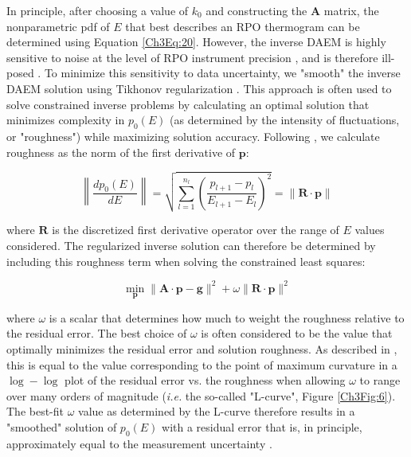 In principle, after choosing a value of $k_{0}$ and constructing the $\mathbf{A}$ matrix, the nonparametric pdf of $E$ that best describes an RPO thermogram can be determined using Equation \ref{Ch3Eq:20}. However, the inverse DAEM is highly sensitive to noise at the level of RPO instrument precision \citep[\textit{i.e.} approximately $\pm 5$ ppm, $\pm 5$\textdegree C;][]{Hemingway:2016rc}, and is therefore ill-posed \citep{Hansen:1994uc}. To minimize this sensitivity to data uncertainty, we "smooth" the inverse DAEM solution using Tikhonov regularization \citep{Tikhonov:1977ui,Hansen:1994uc,Forney:2012dr,Forney:2012hz}. This approach is often used to solve constrained inverse problems by calculating an optimal solution that minimizes complexity in $p_{0}(E)$ (as determined by the intensity of fluctuations, or "roughness") while maximizing solution accuracy. Following \citet{Forney:2012hz}, we calculate roughness as the norm of the first derivative of $\mathbf{p}$:

\begin{equation}\label{Ch3Eq:22}
	\left\| \frac{d p_{0}(E)}{dE} \right\| = \sqrt{ \sum_{l=1}^{n_{l}}\left( \frac{p_{l+1} - p_{l}}{E_{l+1} - E_{l}}\right)^{2}} = \| \mathbf{R} \cdot \mathbf{p} \| 
\end{equation}

where $\mathbf{R}$ is the discretized first derivative operator over the range of $E$ values considered. The regularized inverse solution can therefore be determined by including this roughness term when solving the constrained least squares:

\begin{equation}\label{Ch3Eq:23}
	\min_{\mathbf{p}} \| \mathbf{A} \cdot \mathbf{p} - \mathbf{g} \|^{2} + \omega \| \mathbf{R} \cdot \mathbf{p} \|^{2}
\end{equation}

where $\omega$ is a scalar that determines how much to weight the roughness relative to the residual error. The best choice of $\omega$ is often considered to be the value that optimally minimizes the residual error and solution roughness. As described in \citet{Hansen:1994uc}, this is equal to the value corresponding to the point of maximum curvature in a $\log-\log$ plot of the residual error vs. the roughness when allowing $\omega$ to range over many orders of magnitude (\textit{i.e.} the so-called "L-curve", Figure \ref{Ch3Fig:6}). The best-fit $\omega$ value as determined by the L-curve therefore results in a "smoothed" solution of $p_{0}(E)$ with a residual error that is, in principle, approximately equal to the measurement uncertainty \citep{Forney:2012hz}. 

